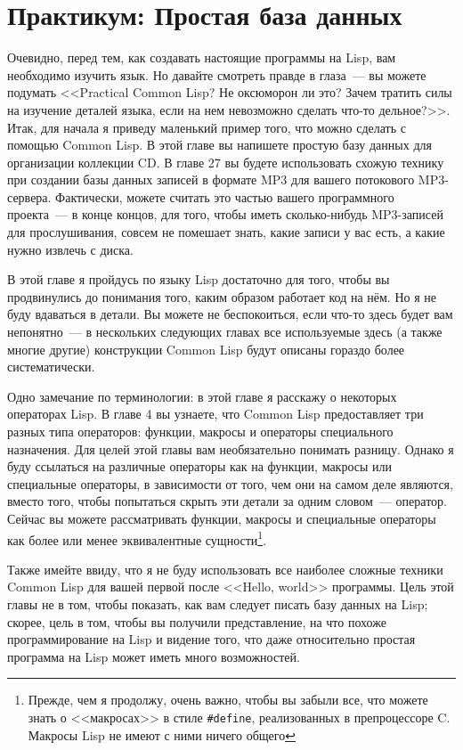 \chapter{Практикум: Простая база данных}
\label{ch:03}

Очевидно, перед тем, как создавать настоящие программы на Lisp, вам необходимо изучить
язык. Но давайте смотреть правде в глаза~--- вы можете подумать <<Practical Common Lisp?
Не оксюморон ли это? Зачем тратить силы на изучение деталей языка, если на нем невозможно
сделать что-то дельное?>>. Итак, для начала я приведу маленький пример того, что можно
сделать с помощью Common Lisp. В этой главе вы напишете простую базу данных для
организации коллекции CD. В главе 27 вы будете использовать схожую технику при создании
базы данных записей в формате MP3 для вашего потокового MP3-сервера. Фактически, можете
считать это частью вашего программного проекта~--- в конце концов, для того, чтобы иметь
сколько-нибудь MP3-записей для прослушивания, совсем не помешает знать, какие записи у вас
есть, а какие нужно извлечь с диска.
 

В этой главе я пройдусь по языку Lisp достаточно для того, чтобы вы продвинулись до
понимания того, каким образом работает код на нём. Но я не буду вдаваться в детали. Вы
можете не беспокоиться, если что-то здесь будет вам непонятно~--- в нескольких следующих
главах все используемые здесь (а также многие другие) конструкции Common Lisp будут
описаны гораздо более систематически.

Одно замечание по терминологии: в этой главе я расскажу о некоторых операторах Lisp. В
главе 4 вы узнаете, что Common Lisp предоставляет три разных типа операторов: функции,
макросы и операторы специального назначения. Для целей этой главы вам необязательно
понимать разницу. Однако я буду ссылаться на различные операторы как на функции, макросы
или специальные операторы, в зависимости от того, чем они на самом деле являются, вместо
того, чтобы попытаться скрыть эти детали за одним словом~--- оператор. Сейчас вы можете
рассматривать функции, макросы и специальные операторы как более или менее эквивалентные
сущности\footnote{Прежде, чем я продолжу, очень важно, чтобы вы забыли все, что можете
  знать о <<макросах>> в стиле \lstinline!#define!, реализованных в препроцессоре C. Макросы
  Lisp не имеют с ними ничего общего}.

Также имейте ввиду, что я не буду использовать все наиболее сложные техники Common Lisp
для вашей первой после <<Hello, world>> программы. Цель этой главы не в том, чтобы показать,
как вам следует писать базу данных на Lisp; скорее, цель в том, чтобы вы получили
представление, на что похоже программирование на Lisp и видение того, что даже
относительно простая программа на Lisp может иметь много возможностей.

